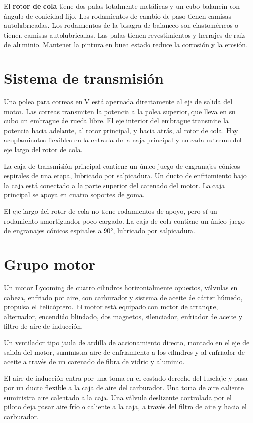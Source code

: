 El \textbf{rotor de cola} tiene dos palas totalmente metálicas y un cubo balancín con ángulo de conicidad fijo. Los rodamientos de cambio de paso tienen camisas autolubricadas. Los rodamientos de la bisagra de balanceo son elastoméricos o tienen camisas autolubricadas. Las palas tienen revestimientos y herrajes de raíz de aluminio. Mantener la pintura en buen estado reduce la corrosión y la erosión.

\section{Sistema de transmisión}

Una polea para correas en V está apernada directamente al eje de salida del motor. Las correas transmiten la potencia a la polea superior, que lleva en su cubo un embrague de rueda libre. El eje interior del embrague transmite la potencia hacia adelante, al rotor principal, y hacia atrás, al rotor de cola. Hay acoplamientos flexibles en la entrada de la caja principal y en cada extremo del eje largo del rotor de cola.

La caja de transmisión principal contiene un único juego de engranajes cónicos espirales de una etapa, lubricado por salpicadura. Un ducto de enfriamiento bajo la caja está conectado a la parte superior del carenado del motor. La caja principal se apoya en cuatro soportes de goma.

El eje largo del rotor de cola no tiene rodamientos de apoyo, pero sí un rodamiento amortiguador poco cargado. La caja de cola contiene un único juego de engranajes cónicos espirales a 90°, lubricado por salpicadura.

\section{Grupo motor}

Un motor Lycoming de cuatro cilindros horizontalmente opuestos, válvulas en cabeza, enfriado por aire, con carburador y sistema de aceite de cárter húmedo, propulsa el helicóptero. El motor está equipado con motor de arranque, alternador, encendido blindado, dos magnetos, silenciador, enfriador de aceite y filtro de aire de inducción.

Un ventilador tipo jaula de ardilla de accionamiento directo, montado en el eje de salida del motor, suministra aire de enfriamiento a los cilindros y al enfriador de aceite a través de un carenado de fibra de vidrio y aluminio.

El aire de inducción entra por una toma en el costado derecho del fuselaje y pasa por un ducto flexible a la caja de aire del carburador. Una toma de aire caliente suministra aire calentado a la caja. Una válvula deslizante controlada por el piloto deja pasar aire frío o caliente a la caja, a través del filtro de aire y hacia el carburador.

